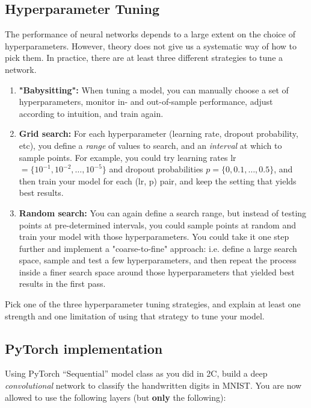 \subsection{Hyperparameter Tuning}
The performance of neural networks depends to a large extent on the choice of hyperparameters. However, theory does not give us a systematic way of how to pick them. In practice, there are at least three different strategies to tune a network.

\begin{enumerate}
    \item \textbf{"Babysitting":} When tuning a model, you can manually choose a set of hyperparameters, monitor in- and out-of-sample performance, adjust according to intuition, and train again.

    \item \textbf{Grid search:} For each hyperparameter (learning rate, dropout probability, etc), you define a \textit{range} of values to search, and an \textit{interval} at which to sample points. For example, you could try learning rates lr$=\{10^{-1}, 10^{-2}, \ldots, 10^{-5}\}$ and dropout probabilities $p=\{0, 0.1, \ldots, 0.5\}$, and then train your model for each (lr, p) pair, and keep the setting that yields best results.

    \item \textbf{Random search:} You can again define a search range, but instead of testing points at pre-determined intervals, you could sample points at random and train your model with those hyperparameters. You could take it one step further and implement a "coarse-to-fine" approach: i.e. define a large search space, sample and test a few hyperparameters, and then repeat the process inside a finer search space around those hyperparameters that yielded best results in the first pass.
\end{enumerate}
\problem[5] Pick one of the three hyperparameter tuning strategies, and explain at least one strength and one limitation of using that strategy to tune your model.

\begin{subsolution}

\end{subsolution}

\subsection{PyTorch implementation}
\problem[20]

Using PyTorch ``Sequential'' model class as you did in 2C, build a deep \emph{convolutional}
network to classify the handwritten digits in MNIST. You are now allowed to use
the following layers (but \textbf{only} the following):

